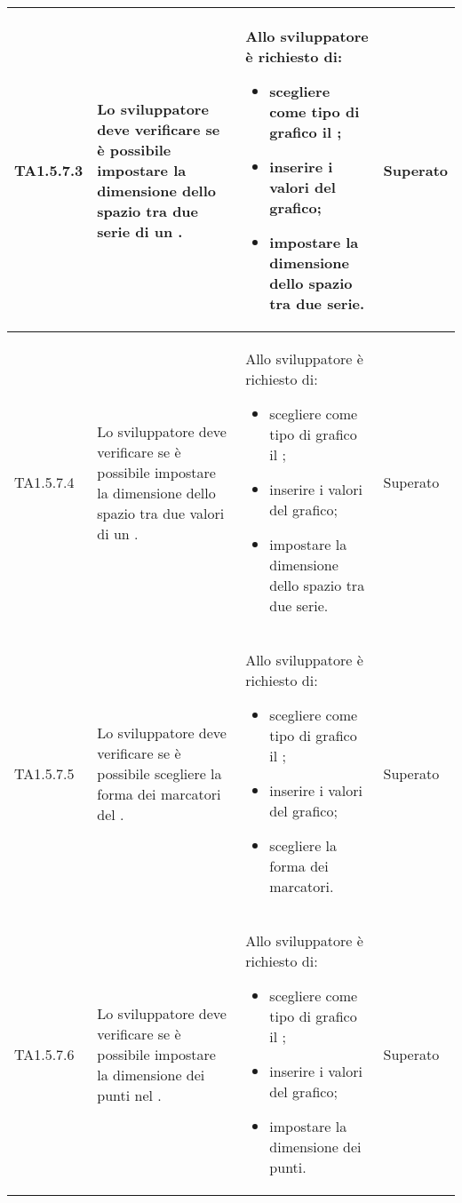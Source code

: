 \begin{longtabu}{| X[0.5] | X | X | X[0.5] |}
	TA1.5.7.3 & Lo sviluppatore deve verificare se è possibile impostare la dimensione dello spazio tra due serie di un .

		& Allo sviluppatore è richiesto di:
		\begin{itemize}
			\item scegliere come tipo di grafico il ;
			\item inserire i valori del grafico;
			\item impostare la dimensione dello spazio tra due serie.
		\end{itemize}
& Superato \\ \hline

	TA1.5.7.4 & Lo sviluppatore deve verificare se è possibile impostare la dimensione dello spazio tra due valori di un .

		& Allo sviluppatore è richiesto di:
		\begin{itemize}
			\item scegliere come tipo di grafico il ;
			\item inserire i valori del grafico;
			\item impostare la dimensione dello spazio tra due serie.
		\end{itemize}
& Superato \\ \hline

	TA1.5.7.5 & Lo sviluppatore deve verificare se è possibile scegliere la forma dei marcatori del .

		& Allo sviluppatore è richiesto di:
		\begin{itemize}
			\item scegliere come tipo di grafico il ;
			\item inserire i valori del grafico;
			\item scegliere la forma dei marcatori.
		\end{itemize}
& Superato \\ \hline

	TA1.5.7.6 & Lo sviluppatore deve verificare se è possibile impostare la dimensione dei punti nel .

		& Allo sviluppatore è richiesto di:
		\begin{itemize}
			\item scegliere come tipo di grafico il ;
			\item inserire i valori del grafico;
			\item impostare la dimensione dei punti.
		\end{itemize}
& Superato \\ \hline


\end{longtabu}
